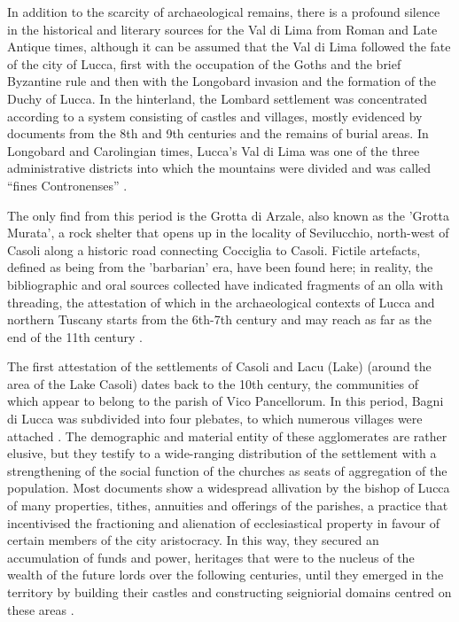 \documentclass[sustainability,article,submit,pdftex,moreauthors]{Definitions/mdpi}
\begin{document}
In addition to the scarcity of archaeological remains, there is a profound silence in the historical and literary sources for the Val di Lima from Roman and Late Antique times, although it can be assumed that the Val di Lima followed the fate of the city of Lucca, first with the occupation of the Goths and the brief Byzantine rule and then with the Longobard invasion and the formation of the Duchy of Lucca. In the hinterland, the Lombard settlement was concentrated according to a system consisting of castles and villages, mostly evidenced by documents from the 8th and 9th centuries and the remains of burial areas. In Longobard and Carolingian times, Lucca's Val di Lima was one of the three administrative districts into which the mountains were divided and was called “fines Contronenses” \cite{qui02, cia06, cia11}.

The only find from this period is the Grotta di Arzale, also known as the 'Grotta Murata', a rock shelter that opens up in the locality of Sevilucchio, north-west of Casoli along a historic road connecting Cocciglia to Casoli. Fictile artefacts, defined as being from the 'barbarian' era, have been found here; in reality, the bibliographic and oral sources collected have indicated fragments of an olla with threading, the attestation of which in the archaeological contexts of Lucca and northern Tuscany starts from the 6th-7th century and may reach as far as the end of the 11th century \cite{gia96}.

The first attestation of the settlements of Casoli and Lacu (Lake) (around the area of the Lake Casoli) dates back to the 10th century, the communities of which appear to belong to the parish of Vico Pancellorum. In this period, Bagni di Lucca was subdivided into four plebates, to which numerous villages were attached \cite{bar41, gia96}. The demographic and material entity of these agglomerates are rather elusive, but they testify to a wide-ranging distribution of the settlement with a strengthening of the social function of the churches as seats of aggregation of the population. Most documents show a widespread allivation by the bishop of Lucca of many properties, tithes, annuities and offerings of the parishes, a practice that incentivised the fractioning and alienation of ecclesiastical property in favour of certain members of the city aristocracy. In this way, they secured an accumulation of funds and power, heritages that were to the nucleus of the wealth of the future lords over the following centuries, until they emerged in
the territory by building their castles and constructing seigniorial domains centred on these areas \cite{qui02, gia96, for12, for15}.
\end{document}
